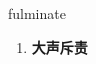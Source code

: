 
\begin{frame}
{\huge fulminate}
\begin{center}
\begin{enumerate}\Large
  \item \textbf{大声斥责}
\end{enumerate}
\end{center}
\end{frame}

